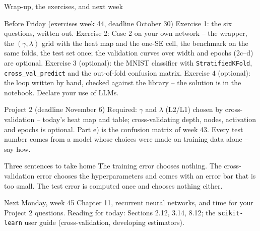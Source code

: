 \documentclass[10pt,aspectratio=169]{beamer}
\begin{document}
\begin{frame}{Wrap-up, the exercises, and next week}
\footnotesize
\begin{block}{Before Friday (exercises week 44, deadline October 30)}
Exercise 1: the six questions, written out.  Exercise 2: Case 2 on your own
network -- the wrapper, the $(\gamma,\lambda)$ grid with the heat map and
the one-SE cell, the benchmark on the same folds, the test set once; the
validation curves over width and epochs (2c--d) are optional.
Exercise 3 (optional): the MNIST classifier with \texttt{StratifiedKFold},
\texttt{cross\_val\_predict} and the out-of-fold confusion matrix.
Exercise 4 (optional): the loop written by hand, checked against the
library -- the solution is in the notebook.  Declare your use of LLMs.
\end{block}
\begin{block}{Project 2 (deadline November 6)}
Required: $\gamma$ and $\lambda$ (L2/L1) chosen by cross-validation --
today's heat map and table; cross-validating depth, nodes, activation and
epochs is optional.  Part e) is the confusion matrix of week 43.  Every test
number comes from a model whose choices were made on training data alone --
say how.
\end{block}
\begin{block}{Three sentences to take home}
The training error chooses nothing.  The cross-validation error chooses
the hyperparameters and comes with an error bar that is too small.  The
test error is computed once and chooses nothing either.
\end{block}
\begin{block}{Next Monday, week 45}
Chapter 11, recurrent neural networks, and time for your Project 2
questions.  Reading for today: Sections 2.12, 3.14, 8.12; the
\texttt{scikit-learn} user guide (cross-validation, developing estimators).
\end{block}
\end{frame}
\end{document}
